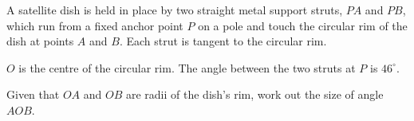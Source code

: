 \begin{question}
\noindent A satellite dish is held in place by two straight metal support struts, $PA$ and $PB$, which run from a fixed anchor point $P$ on a pole and touch the circular rim of the dish at points $A$ and $B$. Each strut is tangent to the circular rim.

$O$ is the centre of the circular rim. The angle between the two struts at $P$ is $46^\circ$.

\begin{center}
\end{center}

\noindent Given that $OA$ and $OB$ are radii of the dish's rim, work out the size of angle $AOB$.

\vspace{4.5cm}
\begin{flushright}
\end{flushright}
\end{question}
